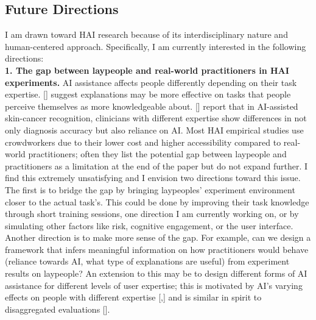 \subsection*{Future Directions}



I am drawn toward HAI research because of its interdisciplinary nature and human-centered approach. Specifically, I am currently interested in the following directions:
\noindent \textbf{\\1. The gap between laypeople and real-world practitioners in HAI experiments.}
AI assistance affects people differently depending on their task expertise. [] suggest explanations may be more effective on tasks that people perceive themselves as more knowledgeable about. [] report that in AI-assisted skin-cancer recognition, clinicians with different expertise show differences in not only diagnosis accuracy but also reliance on AI. Most HAI empirical studies use crowdworkers due to their lower cost and higher accessibility compared to real-world practitioners; often they list the potential gap between laypeople and practitioners as a limitation at the end of the paper but do not expand further. I find this extremely unsatisfying and I envision two directions toward this issue. The first is to bridge the gap by bringing laypeoples' experiment environment closer to the actual task's. This could be done by improving their task knowledge through short training sessions, one direction I am currently working on, or by simulating other factors like risk, cognitive engagement, or the user interface. Another direction is to make more sense of the gap. For example, can we design a framework that infers meaningful information on how practitioners would behave (reliance towards AI, what type of explanations are useful) from experiment results on laypeople? An extension to this may be to design different forms of AI assistance for different levels of user expertise; this is motivated by AI's varying effects on people with different expertise [,] and is similar in spirit to disaggregated evaluations [].
